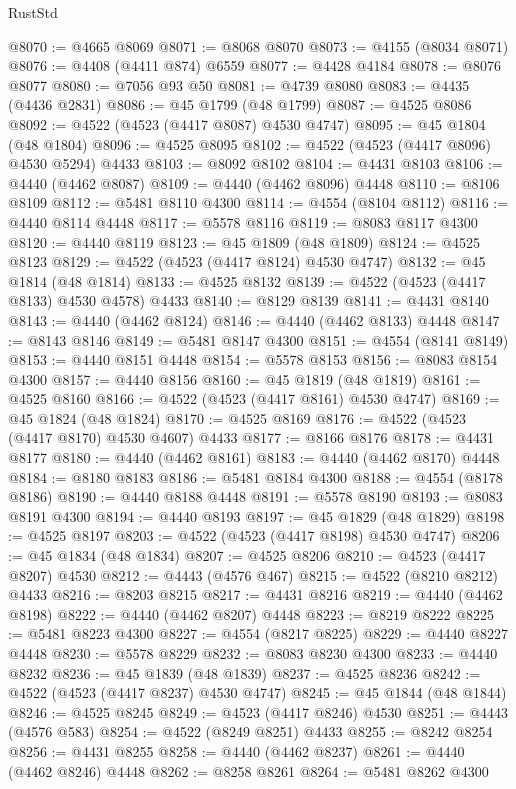 \begin{lexlean}{RustStd}
\begin{coremodule}
@8070 := @4665 @8069
@8071 := @8068 @8070
@8073 := @4155 (@8034 @8071)
@8076 := @4408 (@4411 @874) @6559
@8077 := @4428 @4184
@8078 := @8076 @8077
@8080 := @7056 @93 @50
@8081 := @4739 @8080
@8083 := @4435 (@4436 @2831)
@8086 := @45 @1799 (@48 @1799)
@8087 := @4525 @8086
@8092 := @4522 (@4523 (@4417 @8087) @4530 @4747)
@8095 := @45 @1804 (@48 @1804)
@8096 := @4525 @8095
@8102 := @4522 (@4523 (@4417 @8096) @4530 @5294) @4433
@8103 := @8092 @8102
@8104 := @4431 @8103
@8106 := @4440 (@4462 @8087)
@8109 := @4440 (@4462 @8096) @4448
@8110 := @8106 @8109
@8112 := @5481 @8110 @4300
@8114 := @4554 (@8104 @8112)
@8116 := @4440 @8114 @4448
@8117 := @5578 @8116
@8119 := @8083 @8117 @4300
@8120 := @4440 @8119
@8123 := @45 @1809 (@48 @1809)
@8124 := @4525 @8123
@8129 := @4522 (@4523 (@4417 @8124) @4530 @4747)
@8132 := @45 @1814 (@48 @1814)
@8133 := @4525 @8132
@8139 := @4522 (@4523 (@4417 @8133) @4530 @4578) @4433
@8140 := @8129 @8139
@8141 := @4431 @8140
@8143 := @4440 (@4462 @8124)
@8146 := @4440 (@4462 @8133) @4448
@8147 := @8143 @8146
@8149 := @5481 @8147 @4300
@8151 := @4554 (@8141 @8149)
@8153 := @4440 @8151 @4448
@8154 := @5578 @8153
@8156 := @8083 @8154 @4300
@8157 := @4440 @8156
@8160 := @45 @1819 (@48 @1819)
@8161 := @4525 @8160
@8166 := @4522 (@4523 (@4417 @8161) @4530 @4747)
@8169 := @45 @1824 (@48 @1824)
@8170 := @4525 @8169
@8176 := @4522 (@4523 (@4417 @8170) @4530 @4607) @4433
@8177 := @8166 @8176
@8178 := @4431 @8177
@8180 := @4440 (@4462 @8161)
@8183 := @4440 (@4462 @8170) @4448
@8184 := @8180 @8183
@8186 := @5481 @8184 @4300
@8188 := @4554 (@8178 @8186)
@8190 := @4440 @8188 @4448
@8191 := @5578 @8190
@8193 := @8083 @8191 @4300
@8194 := @4440 @8193
@8197 := @45 @1829 (@48 @1829)
@8198 := @4525 @8197
@8203 := @4522 (@4523 (@4417 @8198) @4530 @4747)
@8206 := @45 @1834 (@48 @1834)
@8207 := @4525 @8206
@8210 := @4523 (@4417 @8207) @4530
@8212 := @4443 (@4576 @467)
@8215 := @4522 (@8210 @8212) @4433
@8216 := @8203 @8215
@8217 := @4431 @8216
@8219 := @4440 (@4462 @8198)
@8222 := @4440 (@4462 @8207) @4448
@8223 := @8219 @8222
@8225 := @5481 @8223 @4300
@8227 := @4554 (@8217 @8225)
@8229 := @4440 @8227 @4448
@8230 := @5578 @8229
@8232 := @8083 @8230 @4300
@8233 := @4440 @8232
@8236 := @45 @1839 (@48 @1839)
@8237 := @4525 @8236
@8242 := @4522 (@4523 (@4417 @8237) @4530 @4747)
@8245 := @45 @1844 (@48 @1844)
@8246 := @4525 @8245
@8249 := @4523 (@4417 @8246) @4530
@8251 := @4443 (@4576 @583)
@8254 := @4522 (@8249 @8251) @4433
@8255 := @8242 @8254
@8256 := @4431 @8255
@8258 := @4440 (@4462 @8237)
@8261 := @4440 (@4462 @8246) @4448
@8262 := @8258 @8261
@8264 := @5481 @8262 @4300

\end{coremodule}
\end{lexlean}
